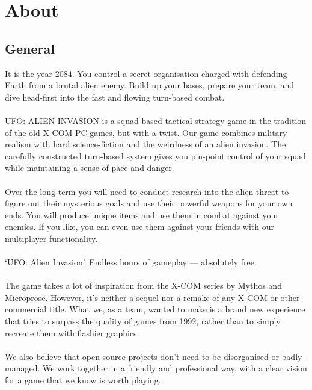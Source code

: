 

\section{About}
\subsection{General}
It is the year 2084. You control a secret organisation charged with defending Earth from a brutal alien enemy. Build up your bases, prepare your team, and dive head-first into the fast and flowing turn-based combat.\\
\\
UFO: ALIEN INVASION is a squad-based tactical strategy game in the tradition of the old X-COM PC games, but with a twist. Our game combines military realism with hard science-fiction and the weirdness of an alien invasion. The carefully constructed turn-based system gives you pin-point control of your squad while maintaining a sense of pace and danger.\\
\\
Over the long term you will need to conduct research into the alien threat to figure out their mysterious goals and use their powerful weapons for your own ends. You will produce unique items and use them in combat against your enemies. If you like, you can even use them against your friends with our multiplayer functionality.\\
\\
`UFO: Alien Invasion'. Endless hours of gameplay --- absolutely free.\\
\\
The game takes a lot of inspiration from the X-COM series by Mythos and Microprose. However, it's neither a sequel nor a remake of any X-COM or other commercial title. What we, as a team, wanted to make is a brand new experience that tries to surpass the quality of games from 1992, rather than to simply recreate them with flashier graphics.\\
\\
We also believe that open-source projects don't need to be disorganised or badly-managed. We work together in a friendly and professional way, with a clear vision for a game that we know is worth playing.

